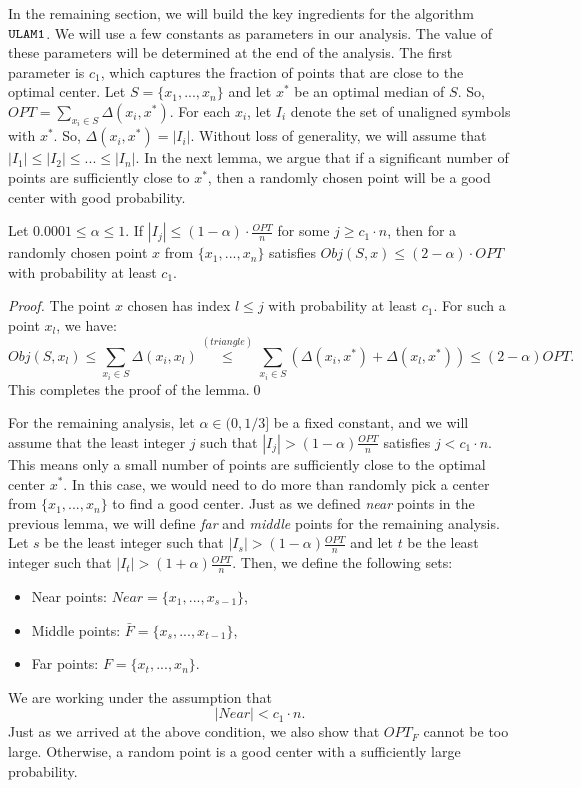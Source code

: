 \documentclass[11pt]{llncs}
\begin{document}
In the remaining section, we will build the key ingredients for the algorithm ${\tt ULAM1}$.
We will use a few constants as parameters in our analysis. 
The value of these parameters will be determined at the end of the analysis.
The first parameter is $c_1$, which captures the fraction of points that are close to the optimal center.
Let $S = \{x_1, ..., x_n\}$
and let $x^{*}$ be an optimal median of $S$. So, $OPT = \sum_{x_i \in S} \Delta(x_i, x^{*})$. 
For each $x_i$, let $I_i$ denote the set of unaligned symbols with $x^{*}$. So, $\Delta(x_i, x^*) = |I_i|$. 
Without loss of generality, we will assume that $|I_1| \leq |I_2| \leq ... \leq |I_n|$. 
In the next lemma, we argue that if a significant number of points are sufficiently close to $x^*$, then a randomly chosen point will be a good center with good probability. 

\begin{lemma}\label{lemma:1}
Let $0.0001 \leq \alpha \leq 1$.
If $|I_j| \leq (1 - \alpha) \cdot \frac{OPT}{n}$ for some $j \geq c_1 \cdot n$, then for a randomly chosen point $x$ from $\{x_1, ..., x_n\}$ satisfies $Obj(S, x) \leq (2 - \alpha) \cdot OPT$ with probability at least $c_1$.
\end{lemma}
\begin{proof}
The point $x$ chosen has index $l \leq j$ with probability at least $c_1$. For such a point $x_l$, we have:
$$
Obj(S, x_l) \leq \sum_{x_i \in S} \Delta(x_i, x_l)
\stackrel{(triangle)}{\leq} \sum_{x_i \in S} (\Delta(x_i, x^*) + \Delta(x_l, x^*)) \leq (2 - \alpha) OPT.
$$
This completes the proof of the lemma.\qed
\end{proof}

For the remaining analysis, let $\alpha \in (0, 1/3]$ be a fixed constant, and we will assume that the least integer $j$ such that $|I_j| > (1-\alpha) \frac{OPT}{n}$ satisfies $j < c_1 \cdot n$. 
This means only a small number of points are sufficiently close to the optimal center $x^*$. 
In this case, we would need to do more than randomly pick a center from $\{x_1, ..., x_n\}$ to find a good center.
Just as we defined {\em near} points in the previous lemma, we will define {\em far} and {\em middle} points for the remaining analysis. Let $s$ be the least integer such that $|I_s| > (1 - \alpha) \frac{OPT}{n}$ and let $t$ be the least integer such that $|I_t| > (1 + \alpha) \frac{OPT}{n}$. Then, we define the following sets:
\begin{itemize}
\item Near points: $Near = \{x_1, ..., x_{s-1}\}$,
\item Middle points: $\bar{F} = \{x_s, ..., x_{t-1}\}$,
\item Far points: $F = \{x_t, ..., x_{n}\}$.
\end{itemize}
We are working under the assumption that 
\begin{equation}\label{eqn:assumption-1}
|Near| < c_1 \cdot n.
\end{equation}
Just as we arrived at the above condition, we also show that $OPT_{F}$ cannot be too large. Otherwise, a random point is a good center with a sufficiently large probability.
\end{document}
